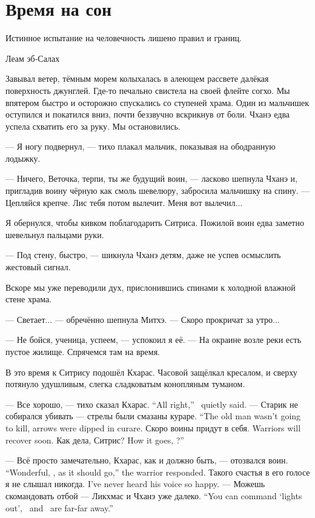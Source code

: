 \section{Время на сон}

\epigraph
{Истинное испытание на человечность лишено правил и границ.}
{Леам эб-Салах}

Завывал ветер, тёмным морем колыхалась в алеющем рассвете далёкая поверхность джунглей.
Где-то печально свистела на своей флейте согхо.
Мы впятером быстро и осторожно спускались со ступеней храма.
Один из мальчишек оступился и покатился вниз, почти беззвучно вскрикнув от боли.
Чханэ едва успела схватить его за руку.
Мы остановились.

--- Я ногу подвернул, --- тихо плакал мальчик, показывая на ободранную лодыжку.

--- Ничего, Веточка, терпи, ты же будущий воин, --- ласково шепнула Чханэ и, пригладив воину чёрную как смоль шевелюру, забросила мальчишку на спину.
--- Цепляйся крепче.
Лис тебя потом вылечит.
Меня вот вылечил...

Я обернулся, чтобы кивком поблагодарить Ситриса.
Пожилой воин едва заметно шевельнул пальцами руки.

--- Под стену, быстро, --- шикнула Чханэ детям, даже не успев осмыслить жестовый сигнал.

Вскоре мы уже переводили дух, прислонившись спинами к холодной влажной стене храма.

--- Светает... --- обречённо шепнула Митхэ.
--- Скоро прокричат за утро...

--- Не бойся, ученица, успеем, --- успокоил я её.
--- На окраине возле реки есть пустое жилище.
Спрячемся там на время.

В это время к Ситрису подошёл Кхарас.
Часовой защёлкал кресалом, и сверху потянуло удушливым, слегка сладковатым конопляным туманом.

{--- Все хорошо, --- тихо сказал Кхарас.}
{``All right,'' \Kcharas\ quietly said.}
{--- Старик не собирался убивать --- стрелы были смазаны кураре.}
{``The old man wasn't going to kill, arrows were dipped in curare.}
{Скоро воины придут в себя.}
{Warriors will recover soon.}
{Как дела, Ситрис?}
{How it goes, \Sitris?''}

{--- Всё просто замечательно, Кхарас, как и должно быть, --- отозвался воин.}
{``Wonderful, \Kcharas, as it should go,'' the warrior responded.}
{Такого счастья в его голосе я не слышал никогда.}
{I've never heard his voice so happy.}
{--- Можешь скомандовать отбой --- Ликхмас и Чханэ уже далеко.}
{``You can command `lights out', \Likchmas\ and \Chhanei\ are far-far away.''}


